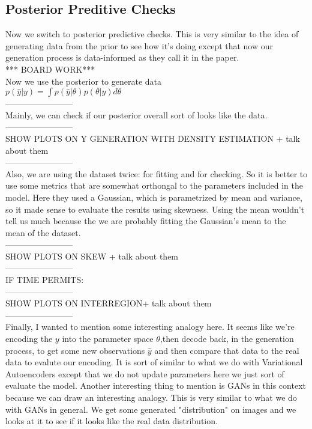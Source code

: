 \documentclass[]{article}
\begin{document}
\subsection*{Posterior Preditive Checks}
Now we switch to posterior predictive checks. This is very similar to the idea of generating data from the prior to see how it's doing except that now our generation process is data-informed as they call it in the paper.\\ 
*** BOARD WORK*** \\
Now we use the posterior to generate data \\
$p(\hat{y}| y) = \int p(\hat{y} | \theta) p(\theta | y) d\theta$\\
------------------------\\
Mainly, we can check if our posterior overall sort of looks like the data.\\
------------------------ \\SHOW PLOTS ON Y GENERATION WITH DENSITY ESTIMATION + talk about them\\ ------------------------\\

Also, we are using the dataset twice: for fitting and for checking. So it is better to use some metrics that are somewhat orthongal to the parameters included in the model. Here they used a Gaussian, which is parametrized by mean and variance, so it made sense to evaluate the results using skewness. Using the mean wouldn't tell us much because the we are probably fitting the Gaussian's mean to the mean of the dataset.  \\
------------------------ \\SHOW PLOTS ON SKEW + talk about them\\ ------------------------\\
IF TIME PERMITS: \\ 
------------------------\\ SHOW PLOTS ON INTERREGION+ talk about them \\------------------------\\

Finally, I wanted to mention some interesting analogy here. It seems like we're encoding the $y$ into the parameter space $\theta$,then decode back, in the generation process, to get some new observations $\hat{y}$ and then compare that data to the real data to evalute our encoding. It is sort of similar to what we do with Variational Autoencoders except that we do not update parameters here we just sort of evaluate the model. Another interesting thing to mention is GANs in this context because we can draw an interesting analogy. This is very similar to what we do with GANs in general. We get some generated "distribution" on images and we looks at it to see if it looks like the real data distribution.
\end{document}
